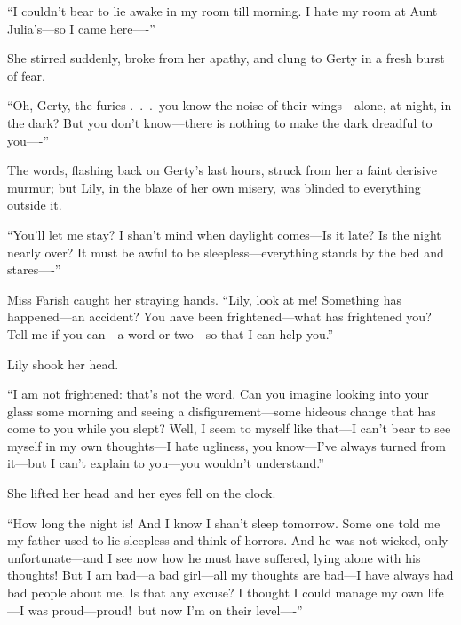 \documentclass[12pt,a4paper]{book}
\begin{document}
``I couldn't bear to lie awake in my room till morning. I hate my
room at Aunt Julia's---so I came here----''





She stirred suddenly, broke from her apathy, and clung to Gerty in
a fresh burst of fear.





``Oh, Gerty, the furies .\ .\ .\ you know the noise of their
wings---alone, at night, in the dark? But you don't know---there is
nothing to make the dark dreadful to you----''





The words, flashing back on Gerty's last hours, struck from her a
faint derisive murmur; but Lily, in the blaze of her own misery,
was blinded to everything outside it.





``You'll let me stay? I shan't mind when daylight comes---Is it
late? Is the night nearly over? It must be awful to be
sleepless---everything stands by the bed and stares----''





Miss Farish caught her straying hands. ``Lily, look at me! 
Something has happened---an accident? You have been
frightened---what has frightened you? Tell me if you can---a word
or two---so that I can help you.''





Lily shook her head.





``I am not frightened: that's not the word. Can you imagine
looking into your glass some morning and seeing a
disfigurement---some hideous change that has come to you while you
slept? Well, I seem to myself like that---I can't bear to see
myself in my own thoughts---I hate ugliness, you know---I've always
turned from it---but I can't explain to you---you wouldn't
understand.''





She lifted her head and her eyes fell on the clock.





``How long the night is! And I know I shan't sleep tomorrow. Some
one told me my father used to lie sleepless and think of horrors. 
And he was not wicked, only unfortunate---and I see now how he
must have suffered, lying alone with his thoughts! But I am
bad---a bad girl---all my thoughts are bad---I have always had bad
people about me. Is that any excuse? I thought I could
manage my own life---I was proud---proud!\ but now I'm on their
level----''
\end{document}
